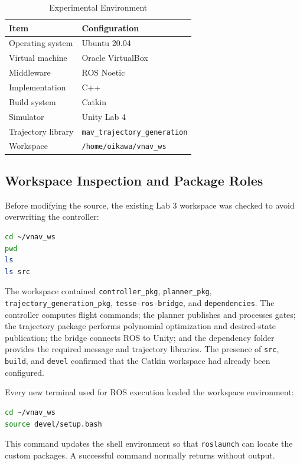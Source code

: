 \documentclass[letterpaper,10pt,conference]{IEEEtran}
\begin{document}
\begin{table}[!htbp]
\caption{Experimental Environment}
\label{tab:environment}
\centering
\footnotesize
\begin{tabular}{@{}p{}p{}@{}}
\toprule
Item & Configuration\\
\midrule
Operating system & Ubuntu 20.04\\
Virtual machine & Oracle VirtualBox\\
Middleware & ROS Noetic\\
Implementation & C++\\
Build system & Catkin\\
Simulator & Unity Lab 4\\
Trajectory library & \texttt{mav\_trajectory\_generation}\\
Workspace & \texttt{/home/oikawa/vnav\_ws}\\
\bottomrule
\end{tabular}
\end{table}

\subsection{Workspace Inspection and Package Roles}
Before modifying the source, the existing Lab 3 workspace was checked to avoid overwriting the controller:
\begin{lstlisting}[language=bash]
cd ~/vnav_ws
pwd
ls
ls src
\end{lstlisting}
The workspace contained \texttt{controller\_pkg}, \texttt{planner\_pkg}, \texttt{trajectory\_generation\_pkg}, \texttt{tesse-ros-bridge}, and \texttt{dependencies}. The controller computes flight commands; the planner publishes and processes gates; the trajectory package performs polynomial optimization and desired-state publication; the bridge connects ROS to Unity; and the dependency folder provides the required message and trajectory libraries. The presence of \texttt{src}, \texttt{build}, and \texttt{devel} confirmed that the Catkin workspace had already been configured.

Every new terminal used for ROS execution loaded the workspace environment:
\begin{lstlisting}[language=bash]
cd ~/vnav_ws
source devel/setup.bash
\end{lstlisting}
This command updates the shell environment so that \texttt{roslaunch} can locate the custom packages. A successful command normally returns without output.
\end{document}
